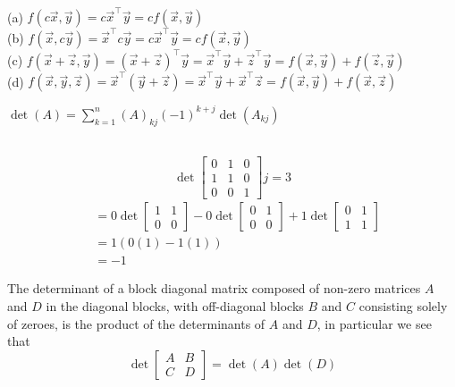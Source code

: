 \documentclass{report}
\begin{document}
\sol \\
(a) $f(c\vec{x}, \vec{y}) = c\vec{x}^{\top}\vec{y} = cf(\vec{x},\vec{y})$ \\
(b) $f(\vec{x}, c\vec{y}) = \vec{x}^{\top}c\vec{y} = c\vec{x}^{\top}\vec{y} = cf(\vec{x},\vec{y})$ \\
(c) $f(\vec{x} + \vec{z}, \vec{y}) = (\vec{x} + \vec{z})^{\top}\vec{y} = \vec{x}^{\top}\vec{y} + \vec{z}^{\top}\vec{y} = f(\vec{x},\vec{y}) + f(\vec{z},\vec{y})$ \\
(d) $f(\vec{x} ,\vec{y}, \vec{z}) = \vec{x}^{\top}(\vec{y} + \vec{z}) = \vec{x}^{\top}\vec{y} + \vec{x}^{\top}\vec{z} = f(\vec{x},\vec{y}) + f(\vec{x},\vec{z})$
\begin{note}
$\operatorname{det}(A) = \sum_{k=1}^n (A)_{kj}(-1)^{k+j} \operatorname{det}(A_{kj})$
\end{note}
\sol \\
$$
\operatorname{det}\begin{bmatrix} 0 & 1 & 0 \\ 1 & 1 & 0 \\ 0 & 0 & 1 \end{bmatrix} j=3
$$
$$
\begin{aligned}
& = 0\operatorname{det}\begin{bmatrix} 1 & 1 \\ 0 & 0 \end{bmatrix} - 0\operatorname{det}\begin{bmatrix} 0 & 1 \\ 0 & 0\end{bmatrix} + 1\operatorname{det}\begin{bmatrix} 0 & 1 \\ 1 & 1\end{bmatrix} \\
& = 1(0(1) - 1(1)) \\
& = -1
\end{aligned}
$$
\begin{note}
The determinant of a block diagonal matrix composed of non-zero matrices $A$ and $D$ in the diagonal blocks, with off-diagonal blocks $B$ and $C$ consisting solely of zeroes, is the product of the determinants of $A$ and $D$, in particular we see that
$$
\operatorname{det}\begin{bmatrix} A & B \\ C & D \end{bmatrix} = \operatorname{det}(A)\operatorname{det}(D)
$$
\end{note}
\end{document}
